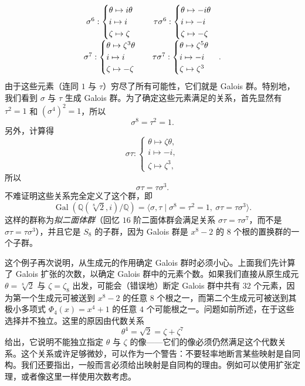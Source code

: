 \[\begin{array}{c@{\quad}c}
\sigma^6:\begin{cases}\theta\mapsto i\theta\\ i\mapsto i\\ \zeta\mapsto\zeta\end{cases}
&
\tau\sigma^6:\begin{cases}\theta\mapsto-i\theta\\ i\mapsto -i\\ \zeta\mapsto-\zeta\end{cases}\\[5mm]
\sigma^7:\begin{cases}\theta\mapsto\zeta^3\theta\\ i\mapsto i\\ \zeta\mapsto-\zeta\end{cases}
&
\tau\sigma^7:\begin{cases}\theta\mapsto\zeta^5\theta\\ i\mapsto -i\\ \zeta\mapsto\zeta^3\end{cases}.
\end{array}
\]
由于这些元素（连同 $1$ 与 $\tau$）穷尽了所有可能性，它们就是 Galois 群。特别地，我们看到 $\sigma$ 与 $\tau$ 生成 Galois 群。为了确定这些元素满足的关系，首先显然有 $\tau^2=1$ 和 $(\sigma^4)^2=1$，所以
\[
\sigma^8=\tau^2=1.
\]
另外，计算得
\[
\sigma\tau:\begin{cases}
\theta\longmapsto\zeta\theta,\\
i\longmapsto -i,\\
\zeta\longmapsto\zeta^3,
\end{cases}
\]
所以
\[
\sigma\tau=\tau\sigma^3.
\]
不难证明这些关系完全定义了这个群，即
\[
\operatorname{Gal}(\mathbb Q(\sqrt[8]{2},i)/\mathbb Q)
=\langle\sigma,\tau\mid \sigma^8=\tau^2=1,\ \sigma\tau=\tau\sigma^3\rangle.
\]
这样的群称为\emph{拟二面体群}（回忆 $16$ 阶二面体群会满足关系 $\sigma\tau=\tau\sigma^7$，而不是 $\sigma\tau=\tau\sigma^3$），并且它是 $S_8$ 的子群，因为 Galois 群是 $x^8-2$ 的 $8$ 个根的置换群的一个子群。

这个例子再次说明，从生成元的作用确定 Galois 群时必须小心。上面我们先计算了 Galois 扩张的次数，以确定 Galois 群中的元素个数。如果我们直接从原生成元 $\theta=\sqrt[8]{2}$ 与 $\zeta=\zeta_8$ 出发，可能会（错误地）断定 Galois 群中共有 $32$ 个元素，因为第一个生成元可被送到 $x^8-2$ 的任意 $8$ 个根之一，而第二个生成元可被送到其极小多项式 $\Phi_4(x)=x^4+1$ 的任意 $4$ 个可能根之一。问题如前所述，在于这些选择并不独立。这里的原因由代数关系
\[
\theta^4=\sqrt2=\zeta+\zeta^7
\]
给出，它说明不能独立指定 $\theta$ 与 $\zeta$ 的像——它们的像必须仍然满足这个代数关系。这个关系或许足够微妙，可以作为一个警告：不要轻率地断言某些映射是自同构。我们还要指出，一般而言必须给出映射是自同构的理由。例如可以使用扩张定理，或者像这里一样使用次数考虑。

